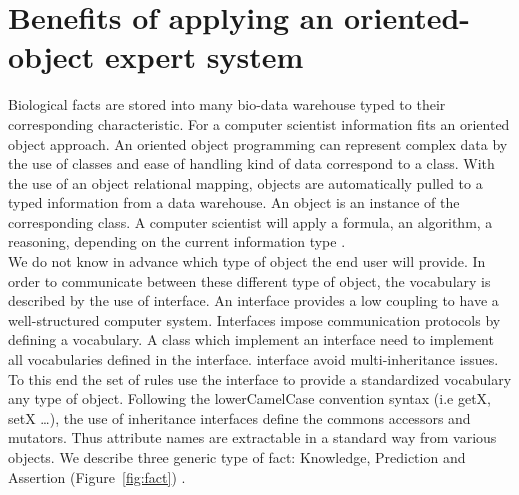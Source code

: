 \documentclass{llncs}
\begin{document}
\section{Benefits of applying an oriented-object expert system}
Biological facts are stored into many bio-data warehouse typed to their corresponding characteristic. For a computer scientist  information  fits  an oriented object approach. An oriented object programming can  represent complex data by the use of classes and ease of handling  kind of data correspond to a class. With the use of an object relational mapping, objects are automatically pulled to a typed information from a data warehouse. An object is an instance of the corresponding class. A computer scientist will apply a formula, an algorithm, a reasoning, depending on the current  information type . \\
We do not know in advance which type of object the end user will provide. In order to communicate between these different type of object, the vocabulary is described by the use of interface. An interface provides a low coupling to have a well-structured computer system. Interfaces impose communication protocols by defining a vocabulary. A class which implement an interface\added{,} need to implement all vocabularies defined in the interface.  interface avoid multi-inheritance issues. To this end the set of rules use the interface to provide a standardized vocabulary  any type of object. Following the lowerCamelCase convention syntax (i.e getX, setX \dots), the use of inheritance interfaces define the commons accessors and mutators. Thus\added{,} attribute names are extractable in a standard way from various objects. We describe three generic type of fact: Knowledge, Prediction and Assertion (Figure~\ref{fig:fact}) .
\end{document}
